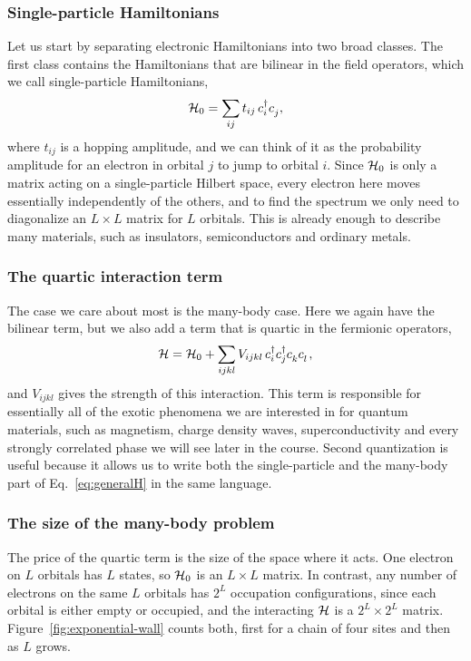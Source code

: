 \documentclass[lecture_notes.tex]{subfiles}
\begin{document}
\subsubsection{Single-particle Hamiltonians}
Let us start by separating electronic Hamiltonians into two broad classes. The first class
contains the Hamiltonians that are bilinear in the field operators, which we call single-particle
Hamiltonians,
\begin{equation}
  \Ham_0 = \sum_{ij} t_{ij}\, \cre{i}\ann{j},
\end{equation}
where $t_{ij}$ is a hopping amplitude, and we can think of it as the probability amplitude for an
electron in orbital $j$ to jump to orbital $i$. Since $\mathcal{H}_0$ is only a matrix acting on a
single-particle Hilbert space, every electron here moves essentially independently of the
others, and to find the spectrum we only need to diagonalize an $L\times L$ matrix for
$L$ orbitals. This is already enough to describe many materials, such as insulators,
semiconductors and ordinary metals.

\subsubsection{The quartic interaction term}
The case we care about most is the many-body case. Here we again have the bilinear term, but we
also add a term that is quartic in the fermionic operators,
\begin{equation}
  \Ham = \Ham_0 + \sum_{ijkl} V_{ijkl}\, \cre{i}\cre{j}\ann{k}\ann{l},
  \label{eq:generalH}
\end{equation}
and $V_{ijkl}$ gives the strength of this interaction. This term is responsible for essentially
all of the exotic phenomena we are interested in for quantum materials, such as magnetism,
charge density waves, superconductivity and every strongly correlated phase we will see later
in the course. Second quantization is useful because it allows us to write both the
single-particle and the many-body part of Eq.~\eqref{eq:generalH} in the same language.

\subsubsection{The size of the many-body problem}
The price of the quartic term is the size of the space where it acts. One electron on $L$
orbitals has $L$ states, so $\mathcal{H}_0$ is an $L\times L$ matrix. In contrast, any number of
electrons on the same $L$ orbitals has $2^L$ occupation configurations, since each orbital is
either empty or occupied, and the interacting $\mathcal{H}$ is a $2^L\times 2^L$ matrix.
Figure~\ref{fig:exponential-wall} counts both, first for a chain of four sites and then as $L$
grows.
\end{document}
